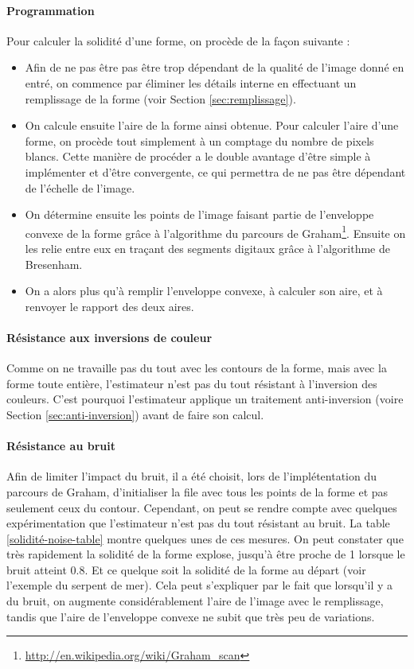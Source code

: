 \documentclass{article}
\theoremstyle{definition}
\begin{document}
	  
	\paragraph{Programmation}
	
	  Pour calculer la solidité d'une forme, on procède de la façon suivante :
	  \begin{itemize}
	   \item Afin de ne pas être pas être trop dépendant de la qualité de l'image donné en entré, on commence par éliminer les détails interne en effectuant un remplissage de la forme (voir Section \ref{sec:remplissage}).
	   \item On calcule ensuite l'aire de la forme ainsi obtenue. Pour calculer l'aire d'une forme, on procède tout simplement à un comptage du nombre de pixels blancs. Cette manière de procéder a le double avantage d'être simple à implémenter et d'être convergente, ce qui permettra de ne pas être dépendant de l'échelle de l'image.
	   \item On détermine ensuite les points de l'image faisant partie de l'enveloppe convexe de la forme grâce à l'algorithme du parcours de Graham\footnote{\url{http://en.wikipedia.org/wiki/Graham_scan}}. Ensuite on les relie entre eux en traçant des segments digitaux grâce à l'algorithme de Bresenham.
	   \item On a alors plus qu'à remplir l'enveloppe convexe, à calculer son aire, et à renvoyer le rapport des deux aires.
	  \end{itemize}
  
  
	\paragraph{Résistance aux inversions de couleur}
	
	  Comme on ne travaille pas du tout avec les contours de la forme, mais avec la forme toute entière, l'estimateur n'est pas du tout résistant à l'inversion des couleurs. C'est pourquoi l'estimateur applique un traitement anti-inversion (voire Section \ref{sec:anti-inversion}) avant de faire son calcul.
	
	\paragraph{Résistance au bruit} Afin de limiter l'impact du bruit, il a été choisit, lors de l'implétentation du parcours de Graham, d'initialiser la file avec tous les points de la forme et pas seulement ceux du contour. Cependant, on peut se rendre compte avec quelques expérimentation que l'estimateur n'est pas du tout résistant au bruit. La table \ref{solidité-noise-table} montre quelques unes de ces mesures. On peut constater que très rapidement la solidité de la forme explose, jusqu'à être proche de 1 lorsque le bruit atteint 0.8. Et ce quelque soit la solidité de la forme au départ (voir l'exemple du serpent de mer). Cela peut s'expliquer par le fait que lorsqu'il y a du bruit, on augmente considérablement l'aire de l'image avec le remplissage, tandis que l'aire de l'enveloppe convexe ne subit que très peu de variations. \\
\end{document}
